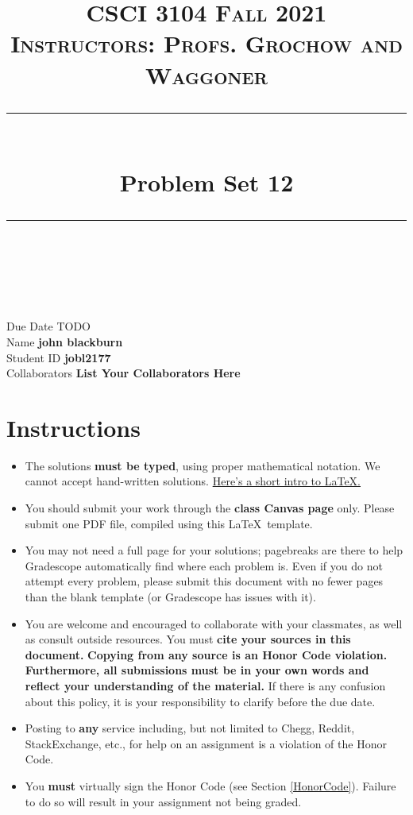 \documentclass[11pt]{article}
\title{
\normalfont \normalsize 
\textsc{CSCI 3104 Fall 2021 \\ 
Instructors: Profs. Grochow and Waggoner} \\
[10pt] 
\rule{\linewidth}{0.5pt} \\[6pt] 
\huge Problem Set 12 \\
\rule{\linewidth}{2pt}  \\[10pt]
}
\date{}
\theoremstyle{definition}
\theoremstyle{definition}
\theoremstyle{definition}
\begin{document}
\maketitle


\noindent
Due Date \dotfill TODO \\
Name \dotfill \textbf{john blackburn} \\
Student ID \dotfill \textbf{jobl2177} \\
Collaborators \dotfill \textbf{List Your Collaborators Here}

\tableofcontents

\section{Instructions}
 \begin{itemize}
	\item The solutions \textbf{must be typed}, using proper mathematical notation. We cannot accept hand-written solutions. \href{http://ece.uprm.edu/~caceros/latex/introduction.pdf}{Here's a short intro to \LaTeX.}
	\item You should submit your work through the \textbf{class Canvas page} only. Please submit one PDF file, compiled using this \LaTeX \ template.
	\item You may not need a full page for your solutions; pagebreaks are there to help Gradescope automatically find where each problem is. Even if you do not attempt every problem, please submit this document with no fewer pages than the blank template (or Gradescope has issues with it).

	\item You are welcome and encouraged to collaborate with your classmates, as well as consult outside resources. You must \textbf{cite your sources in this document.} \textbf{Copying from any source is an Honor Code violation. Furthermore, all submissions must be in your own words and reflect your understanding of the material.} If there is any confusion about this policy, it is your responsibility to clarify before the due date. 

	\item Posting to \textbf{any} service including, but not limited to Chegg, Reddit, StackExchange, etc., for help on an assignment is a violation of the Honor Code.

	\item You \textbf{must} virtually sign the Honor Code (see Section \ref{HonorCode}). Failure to do so will result in your assignment not being graded.
\end{itemize}
\end{document}
